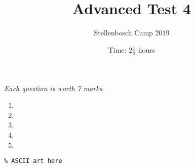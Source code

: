 \documentclass{article}
\title{Advanced Test 4}
\author{Stellenbosch Camp 2019}
\date{Time: $2\frac{1}{2}$ hours}
\begin{document}
\maketitle
\thispagestyle{empty}

\hfill\textit{Each question is worth 7 marks.}

\vfill
\vfill


\begin{enumerate}[1.]

\item %


\vfill

\item %


\vfill

\item %


\vfill

\item %


\vfill

\item %


\end{enumerate}


\vfill
\vfill
\begin{center}
\begin{BVerbatim}
\end{BVerbatim}
\end{center}
\end{document}
